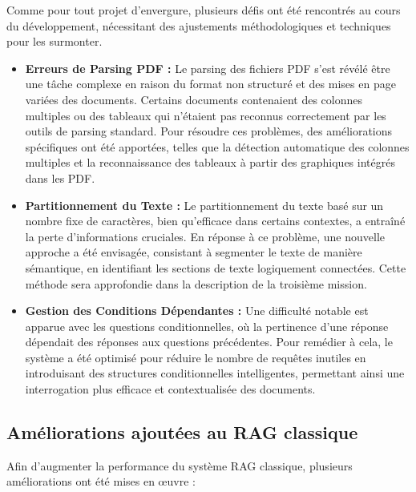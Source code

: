 \documentclass[13pt,a4paper]{article}
\begin{document}
Comme pour tout projet d'envergure, plusieurs défis ont été rencontrés au cours du développement, nécessitant des ajustements méthodologiques et techniques pour les surmonter.

\begin{itemize}
\item \textbf{Erreurs de Parsing PDF :} Le parsing des fichiers PDF s'est révélé être une tâche complexe en raison du format non structuré et des mises en page variées des documents. Certains documents contenaient des colonnes multiples ou des tableaux qui n'étaient pas reconnus correctement par les outils de parsing standard. Pour résoudre ces problèmes, des améliorations spécifiques ont été apportées, telles que la détection automatique des colonnes multiples et la reconnaissance des tableaux à partir des graphiques intégrés dans les PDF.
\item \textbf{Partitionnement du Texte :} Le partitionnement du texte basé sur un nombre fixe de caractères, bien qu'efficace dans certains contextes, a entraîné la perte d'informations cruciales. En réponse à ce problème, une nouvelle approche a été envisagée, consistant à segmenter le texte de manière sémantique, en identifiant les sections de texte logiquement connectées. Cette méthode sera approfondie dans la description de la troisième mission.

\item \textbf{Gestion des Conditions Dépendantes :} Une difficulté notable est apparue avec les questions conditionnelles, où la pertinence d'une réponse dépendait des réponses aux questions précédentes. Pour remédier à cela, le système a été optimisé pour réduire le nombre de requêtes inutiles en introduisant des structures conditionnelles intelligentes, permettant ainsi une interrogation plus efficace et contextualisée des documents.
\end{itemize}

\subsection{Améliorations ajoutées au RAG classique}

Afin d'augmenter la performance du système RAG classique, plusieurs améliorations ont été mises en œuvre :
\end{document}
